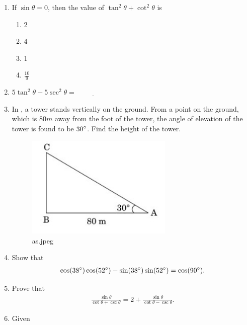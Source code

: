\begin{enumerate}
    
    \item If $\sin \theta=0$, then the value of $\tan^2\theta+\cot^2\theta$ is
    \begin{enumerate}
        \hfill{}\item $2$
        \hfill{}\item $4$
        \hfill{}\item $1$
        \hfill{}\item $\frac{10}{9}$
    \end{enumerate}
    \hfill{}\item $5\tan^2 \theta - 5\sec^2\theta = \underline{\hspace{2cm}}$
    \hfill{}\item In  , a tower stands vertically on the ground. From a point on the ground, which is $80m$ away from the foot of the tower, the angle of elevation of the tower is found to be $30\degree$. Find the height of the tower.
    \begin{figure}[H]
        \centering
        \includegraphics[width=70mm]{cbse-math/figs/as.jpeg}
        \caption{as.jpeg}
        \label{fig:as.jpeg}
    \end{figure}
    \hfill{}\item Show that 
    \begin{align}
        \cos(38\degree) \cos(52\degree) - \sin(38\degree)\sin(52\degree) = \cos(90\degree).
    \end{align}
    \hfill{}\item Prove that 
    \begin{align}
        \frac{\sin\theta}{\cot\theta+\csc\theta} = 2+\frac{\sin\theta}{\cot\theta-\csc\theta}.
    \end{align}
    \hfill{}\item Given 
    \begin{align}

\end{align}
\end{enumerate}
